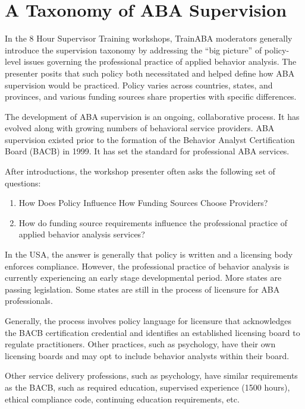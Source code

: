 \section{A Taxonomy of ABA Supervision}
In the 8 Hour Supervisor Training workshops, TrainABA moderators generally introduce the supervision taxonomy by addressing the ``big picture'' of policy-level issues governing the professional practice of applied behavior analysis. The presenter posits that such policy both necessitated and helped define how ABA supervision would be practiced. Policy varies across countries, states, and provinces, and various funding sources share properties with specific differences. 

The development of ABA supervision is an ongoing, collaborative process. It has evolved along with growing numbers of behavioral service providers. ABA supervision existed prior to the formation of the Behavior Analyst Certification Board\textregistered{} (BACB\textregistered{}) in 1999. It has set the standard for professional ABA services.

After introductions, the workshop presenter often asks the following set of questions:

\begin{enumerate}
\item How Does Policy Influence How Funding Sources Choose Providers? 
\item How do funding source requirements influence the professional practice of applied behavior analysis services?
\end{enumerate}

In the USA, the answer is generally that policy is written and a licensing body enforces compliance. However, the professional practice of behavior analysis is currently experiencing an early stage developmental period. More states are passing legislation. Some states are still in the process of licensure for ABA professionals. 

Generally, the process involves policy language for licensure that acknowledges the BACB\textregistered{} certification credential and identifies an established licensing board to regulate practitioners. Other practices, such as psychology, have their own licensing boards and may opt to include behavior analysts within their board. 

Other service delivery professions, such as psychology, have similar requirements as the BACB\textregistered{}, such as required education, supervised experience (1500 hours), ethical compliance code, continuing education requirements, etc. 

